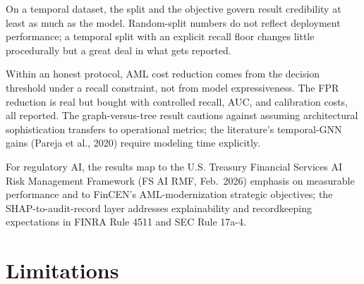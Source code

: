 \documentclass[11pt]{article}
\begin{document}
On a temporal dataset, the split and the objective govern result credibility at least as much as the model. Random-split numbers do not reflect deployment performance; a temporal split with an explicit recall floor changes little procedurally but a great deal in what gets reported.

Within an honest protocol, AML cost reduction comes from the decision threshold under a recall constraint, not from model expressiveness. The FPR reduction is real but bought with controlled recall, AUC, and calibration costs, all reported. The graph-versus-tree result cautions against assuming architectural sophistication transfers to operational metrics; the literature's temporal-GNN gains (Pareja et al., 2020) require modeling time explicitly.

For regulatory AI, the results map to the U.S. Treasury Financial Services AI Risk Management Framework (FS AI RMF, Feb.\ 2026) emphasis on measurable performance and to FinCEN's AML-modernization strategic objectives; the SHAP-to-audit-record layer addresses explainability and recordkeeping expectations in FINRA Rule 4511 and SEC Rule 17a-4.

\section{Limitations}
\end{document}
